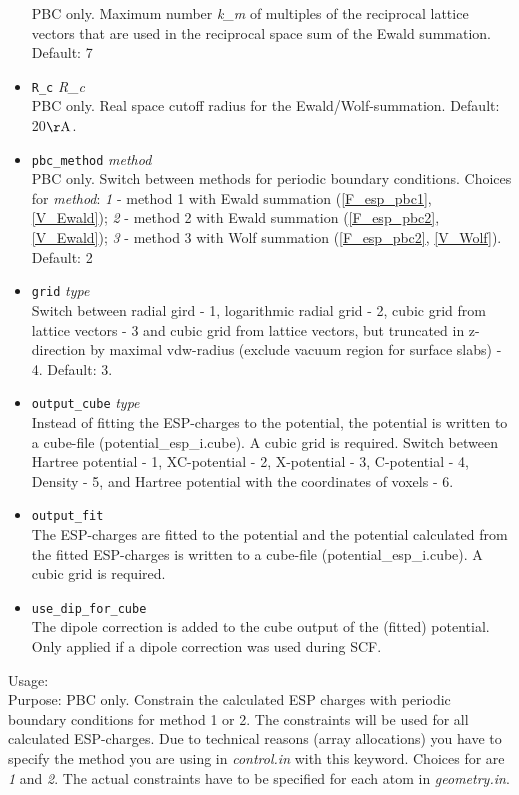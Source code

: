 \begin{itemize}
  PBC only. Maximum number \textit{k\_m} of multiples of the reciprocal lattice vectors that are used in the reciprocal space sum of the Ewald summation. 
  Default: 7
\item {} \texttt{R\_c} \textit{R\_c} \\
  PBC only. Real space cutoff radius for the Ewald/Wolf-summation. Default: 20$\mathrm{\AA}$.
\item {} \texttt{pbc\_method} \textit{method} \\
  PBC only. Switch between methods for periodic boundary conditions. Choices for \textit{method}: \textit{1} - method 1 
  with Ewald summation (\ref{F_esp_pbc1}, \ref{V_Ewald}); \textit{2} - method 2 with Ewald summation (\ref{F_esp_pbc2}, 
  \ref{V_Ewald});   \textit{3} - method 3 with Wolf summation (\ref{F_esp_pbc2}, \ref{V_Wolf}). Default: 2
\item {} \texttt{grid} \textit{type}\\
  Switch between radial gird - 1, logarithmic radial grid - 2, cubic grid from lattice vectors - 3 and cubic grid from lattice vectors, but truncated in z-direction by maximal vdw-radius (exclude vacuum region for surface slabs) - 4. Default: 3. 
\item {} \texttt{output\_cube} \textit{type}\\
  Instead of fitting the ESP-charges to the potential, the potential is written to a cube-file (potential\_esp\_i.cube).  A cubic grid is required. Switch between Hartree potential - 1, XC-potential - 2,  X-potential - 3, C-potential - 4, Density - 5, and Hartree potential with the coordinates of voxels - 6.
\item {} \texttt{output\_fit}\\
  The ESP-charges are fitted to the potential and the potential calculated from the fitted ESP-charges is written to a cube-file (potential\_esp\_i.cube). A cubic grid is required.
\item {} \texttt{use\_dip\_for\_cube}\\
  The dipole correction is added to the cube output of the (fitted) potential. Only applied if a dipole correction was used during SCF. 

  \end{itemize}
{
  \noindent
  Usage:  \\[1.0ex]
  Purpose: PBC only. Constrain the calculated ESP charges with periodic boundary conditions for method 1 or 2. The constraints 
  will be used for all calculated ESP-charges. Due to technical reasons (array allocations) you have to specify the method 
  you are using in \textit{control.in} with this keyword. Choices for  are \textit{1} and \textit{2}. The actual 
  constraints have to be specified for each atom in \textit{geometry.in}.\\[1.0ex]
}
